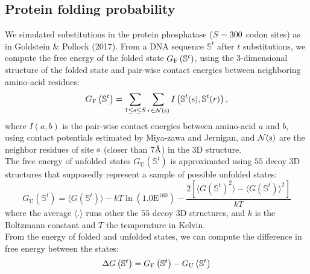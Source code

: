 \subsection{Protein folding probability}
\label{subsec:protein-folding-probability}

We simulated substitutions in the protein phosphatase ($S=300$ codon sites) as in Goldstein \& Pollock (2017).
From a \acrshort{DNA} sequence $\mathbb{S}^t$ after $t$ substitutions, we compute the free energy of the folded state $G_{\mathrm{F}}\left(\mathbb{S}^{t}\right)$, using the $3$-dimensional structure of the folded state and pair-wise contact energies between neighboring amino-acid residues:
\begin{equation}
    G_{\mathrm{F}}\left(\mathbb{S}^{t}\right) = \sum\limits_{1 \leq \text{s} \leq S} \sum\limits_{r \in \mathcal{N}(\text{s})} I \left(\mathbb{S}^t(\text{s}), \mathbb{S}^t(r) \right),
\end{equation}
where $I(a,b)$ is the pair-wise contact energies between amino-acid $a$ and $b$, using contact potentials estimated by Miya-zawa and Jernigan, and $\mathcal{N}(\text{s})$ are the neighbor residues of site $\text{s}$ (closer than $7\text{\normalfont\AA}$) in the $3$D structure.\\

The free energy of unfolded states $G_{\mathrm{U}}\left(\mathbb{S}^{t}\right)$ is approximated using $55$ decoy $3$D structures that supposedly represent a sample of possible unfolded states:
\begin{equation}
    G_{\mathrm{U}}\left(\mathbb{S}^{t}\right) = \langle G\left(\mathbb{S}^{t}\right) \rangle - kT \ln (1.0\mathrm{E}^{160}) - \dfrac{2 \left[ \langle G\left(\mathbb{S}^{t}\right)^2 \rangle - \langle G\left(\mathbb{S}^{t}\right) \rangle^2\right] }{kT}
\end{equation}
where the average $\langle . \rangle$ runs other the $55$ decoy $3$D structures, and $k$ is the Boltzmann constant and $T$ the temperature in Kelvin.\\

From the energy of folded and unfolded states, we can compute the difference in free energy between the states:
\begin{equation}
    \Delta G\left(\mathbb{S}^{t}\right) = G_{\mathrm{F}}\left(\mathbb{S}^{t}\right) - G_{\mathrm{U}}\left(\mathbb{S}^{t}\right)
\end{equation}


